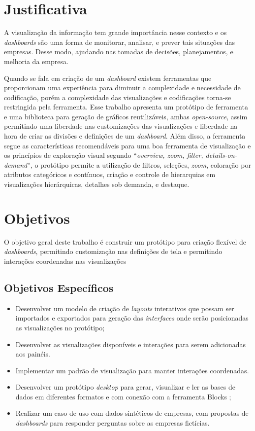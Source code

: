 \documentclass[
	12pt,				%
	openright,			%
	oneside,			%
	a4paper,			%
	english,			%
	brazil				%
	]{abntex2}
\begin{document}
\section{Justificativa}
\label{ch:justificativa}

A visualização da informação tem grande importância nesse contexto e os \textit{dashboards} são uma forma de monitorar, analisar, e prever tais situações das empresas. Desse modo, ajudando nas tomadas de decisões, planejamentos, e melhoria da empresa. 

Quando se fala em criação de um \textit{dashboard} existem ferramentas que proporcionam uma experiência para diminuir a complexidade e necessidade de codificação, porém a complexidade das visualizações e codificações torna-se restringida pela ferramenta. Esse trabalho apresenta um protótipo de ferramenta e uma biblioteca para geração de gráficos reutilizáveis, ambas \textit{open-source}, assim permitindo uma liberdade nas customizações das visualizações e liberdade na hora de criar as divisões e definições de um \textit{dashboard}. Além disso, a ferramenta segue as características recomendáveis para uma boa ferramenta de visualização e os princípios de exploração visual segundo \cite{Shneiderman1996} ``\textit{overview, zoom, filter, details-on-demand}'', o protótipo permite a utilização de filtros, seleções, \textit{zoom}, coloração por atributos categóricos e contínuos, criação e controle de hierarquias em visualizações hierárquicas, detalhes sob demanda, e destaque.

\section{Objetivos}
O objetivo geral deste trabalho é construir um protótipo para criação flexível de \textit{dashboards}, permitindo customização nas definições de tela e permitindo interações coordenadas nas visualizações

\subsection {Objetivos Específicos}

\begin{itemize}
    \item Desenvolver um modelo de criação de \textit{layouts} interativos que possam ser importados e exportados para geração das \textit{interfaces} onde serão posicionadas as visualizações no protótipo;
    \item Desenvolver as visualizações disponíveis e interações para serem adicionadas aos painéis.
    \item Implementar um padrão de visualização para manter interações coordenadas.
    \item  Desenvolver um protótipo \textit{desktop} para gerar, visualizar e ler as bases de dados em diferentes formatos e com conexão com a ferramenta Blocks  \cite{blocks};
    \item Realizar um caso de uso com dados sintéticos de empresas, com propostas de \textit{dashboards} para responder perguntas sobre as empresas fictícias.

    
\end{itemize}
\end{document}
